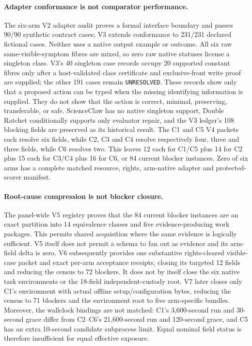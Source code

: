 \paragraph{Adapter conformance is not comparator performance.}
The six-arm V2 adapter audit proves a formal interface boundary and passes
90/90 synthetic contract cases; V3 extends conformance to 231/231 declared
fictional cases. Neither uses a native output example or outcome. All six raw
same-visible-symptom fibres are mixed, so zero raw native statuses license a
singleton class. V3's 40 singleton case records occupy 20 supported constant
fibres only after a host-validated class certificate and exclusive-front write
proof are supplied; the other 191 cases remain \texttt{UNRESOLVED}. These
records show only that a proposed action can be typed when the missing
identifying information is supplied. They do not show that the action is
correct, minimal, preserving, transferable, or safe. ScienceClaw has no native
singleton support, Double Ratchet conditionally supports only evaluator repair,
and the V3 ledger's 108 blocking fields are preserved as its historical result.
The C1 and C5 V4 packets each resolve six fields, while C2, C3 and C4 resolve
respectively four, three and three fields, while C6 resolves two. This leaves
12 each for C1/C5 plus 14 for C2 plus 15 each for C3/C4 plus 16 for C6, or 84
current blocker instances.
Zero of six arms has a complete
matched resource, rights, arm-native adapter and protected-scorer manifest.

\paragraph{Root-cause compression is not blocker closure.}
The panel-wide V5 registry proves that the 84 current blocker instances are an
exact partition into 14 equivalence classes and five evidence-producing work
packages. This permits shared acquisition where the same evidence is logically
sufficient. V5 itself does not permit a schema to fan out as evidence and its
arm-field delta is zero. V6 subsequently provides one substantive
rights-cleared visible-case packet and exact per-arm acceptance receipts,
closing its targeted 12 fields and reducing the census to 72 blockers. It does
not by itself close the six native task environments or the 18-field
independent-custody root. V7 later closes only C1's environment with actual
offline setup/configuration bytes, reducing the census to 71 blockers and the
environment root to five arm-specific bundles. Moreover, the wallclock
bindings are not matched: C1's 3,600-second run
and 30-second grace differ from C2--C6's 21,600-second run and 120-second grace,
and C5 has an extra 10-second candidate subprocess limit. Equal nominal field
status is therefore insufficient for equal effective exposure.

